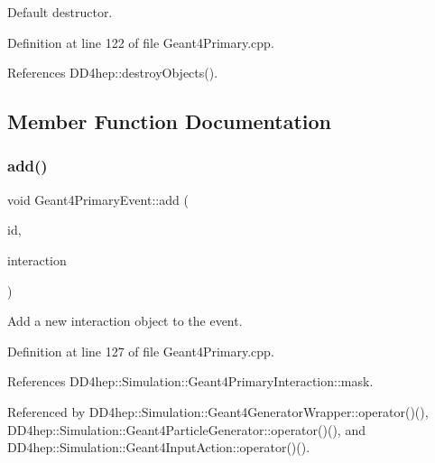 Default destructor. 



Definition at line 122 of file Geant4\+Primary.\+cpp.



References D\+D4hep\+::destroy\+Objects().



\subsection{Member Function Documentation}
\hypertarget{class_d_d4hep_1_1_simulation_1_1_geant4_primary_event_ae18431e26176abdd03ddbcd4b4097605}{}\label{class_d_d4hep_1_1_simulation_1_1_geant4_primary_event_ae18431e26176abdd03ddbcd4b4097605} 
\subsubsection{\texorpdfstring{add()}{add()}}
{\footnotesize\ttfamily void Geant4\+Primary\+Event\+::add (\begin{DoxyParamCaption}\item[{int}]{id,  }\item[{\hyperlink{class_d_d4hep_1_1_simulation_1_1_geant4_primary_interaction}{Geant4\+Primary\+Interaction} $\ast$}]{interaction }\end{DoxyParamCaption})}



Add a new interaction object to the event. 



Definition at line 127 of file Geant4\+Primary.\+cpp.



References D\+D4hep\+::\+Simulation\+::\+Geant4\+Primary\+Interaction\+::mask.



Referenced by D\+D4hep\+::\+Simulation\+::\+Geant4\+Generator\+Wrapper\+::operator()(), D\+D4hep\+::\+Simulation\+::\+Geant4\+Particle\+Generator\+::operator()(), and D\+D4hep\+::\+Simulation\+::\+Geant4\+Input\+Action\+::operator()().

\hypertarget{class_d_d4hep_1_1_simulation_1_1_geant4_primary_event_ad409e46a1d08c8302033c81cc3e52e3d}{}\label{class_d_d4hep_1_1_simulation_1_1_geant4_primary_event_ad409e46a1d08c8302033c81cc3e52e3d} 
